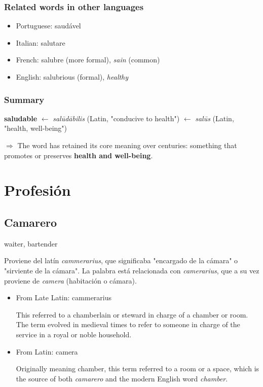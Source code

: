 \documentclass[10pt]{book}
\newcommand{\wordentry}[2]{
	\large #1
	\vspace{-0.5em}
	\begin{etymologybox}
		#2
	\end{etymologybox}
}
\let\oldsection\section
\renewcommand{\section}[1]{
	\needspace{8\baselineskip}
	\oldsection{#1}
}
\begin{document}
	\subsection*{Related words in other languages}
	\begin{itemize}
		\item Portuguese: saudável
		\item Italian: salutare
		\item French: salubre (more formal), \textit{sain} (common)
		\item English: salubrious (formal), \textit{healthy}
	\end{itemize}
	
	\subsection*{Summary}
	\textbf{saludable} $\leftarrow$ \textit{salūdābilis} (Latin, "conducive to health") $\leftarrow$ \textit{salūs} (Latin, "health, well-being")
	
	$\Rightarrow$ The word has retained its core meaning over centuries: something that promotes or preserves \textbf{health and well-being}.
	
	\chapter{Profesión}
	
	\section{Camarero}
	\wordentry{waiter, bartender}{
		Proviene del latín \textit{cammerarius}, que significaba "encargado de la cámara" o "sirviente de la cámara". La palabra está relacionada con \textit{camerarius}, que a su vez proviene de \textit{camera} (habitación o cámara).
		\begin{itemize}
			\item From Late Latin: cammerarius
			
			This referred to a chamberlain or steward in charge of a chamber or room. The term evolved in medieval times to refer to someone in charge of the service in a royal or noble household.
			
			\item From Latin: camera
			
			Originally meaning chamber, this term referred to a room or a space, which is the source of both \textit{camarero} and the modern English word \textit{chamber}.
		\end{itemize}
	}
	
\end{document}
